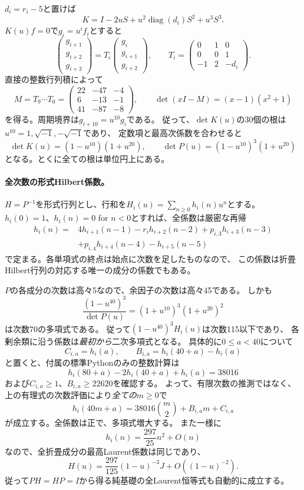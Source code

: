 \documentclass[11pt,a4paper]{ltjsarticle}
\begin{document}
$d_i=r_i-5$と置けば
\[
K=I-2uS+u^2\operatorname{diag}(d_i)S^2+u^3S^3.
\]
$K(u)f=0$で$g_i=u^i f_i$とすると
\[
\begin{pmatrix}g_{i+1}\\g_{i+2}\\g_{i+3}\end{pmatrix}
=T_i\begin{pmatrix}g_i\\g_{i+1}\\g_{i+2}\end{pmatrix},\qquad
T_i=\begin{pmatrix}0&1&0\\0&0&1\\-1&2&-d_i\end{pmatrix}.
\]
直接の整数行列積によって
\[
M=T_9\cdots T_0=
\begin{pmatrix}22&-47&-4\\6&-13&-1\\41&-87&-8\end{pmatrix},
\qquad \det(xI-M)=(x-1)(x^2+1)
\]
を得る。周期境界は$g_{i+10}=u^{10}g_i$である。
従って、$\det K(u)$の30個の根は$u^{10}=1,\sqrt{-1},-\sqrt{-1}$であり、
定数項と最高次係数を合わせると
\[
\det K(u)=(1-u^{10})(1+u^{20}),\qquad
\det P(u)=(1-u^{10})^3(1+u^{20})
\]
となる。とくに全ての根は単位円上にある。

\paragraph{全次数の形式Hilbert係数。}
$H=P^{-1}$を形式行列とし、行和を$H_i(u)=\sum_{n\ge0}h_i(n)u^n$とする。
$h_i(0)=1$、$h_i(n)=0$ for $n<0$とすれば、全係数は厳密な再帰
\begin{align*}
h_i(n)={}&4h_{i+1}(n-1)-r_i h_{i+2}(n-2)
+p_{i,3}h_{i+3}(n-3)\\
&+p_{i,4}h_{i+4}(n-4)-h_{i+5}(n-5)
\end{align*}
で定まる。各単項式の終点は始点に次数を足したものなので、
この係数は折畳Hilbert行列の対応する唯一の成分の係数でもある。

$P$の各成分の次数は高々5なので、余因子の次数は高々45である。
しかも
\[
\frac{(1-u^{40})^3}{\det P(u)}=(1+u^{10})^3(1+u^{20})^2
\]
は次数70の多項式である。
従って$(1-u^{40})^3H_i(u)$は次数115以下であり、
各剰余類に沿う係数は\emph{最初から}二次多項式となる。
具体的に$0\le a<40$について
\[
C_{i,a}=h_i(a),\qquad B_{i,a}=h_i(40+a)-h_i(a)
\]
と置くと、付属の標準Pythonのみの整数計算は
\[
h_i(80+a)-2h_i(40+a)+h_i(a)=38016
\]
および$C_{i,a}\ge1$、$B_{i,a}\ge22620$を確認する。
よって、有限次数の推測ではなく、上の有理式の次数評価により\emph{全ての}$m\ge0$で
\begin{equation}\label{note:eq:n4-formal-quasipolynomial}
h_i(40m+a)=38016\binom m2+B_{i,a}m+C_{i,a}
\end{equation}
が成立する。全係数は正で、多項式増大する。
また一様に
\[
h_i(n)=\frac{297}{25}n^2+O(n)
\]
なので、全折畳成分の最高Laurent係数は同じであり、
\[
H(u)=\frac{297}{125}(1-u)^{-3}J+O((1-u)^{-2}).
\]
従って$PH=HP=I$から得る純基礎の全Laurent恒等式も自動的に成立する。
\end{document}
